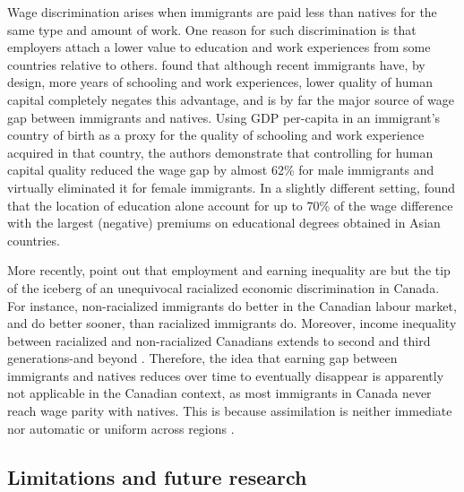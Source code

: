 \vspace{0.7em}\par
Wage discrimination arises when immigrants are paid less than natives for the same type and amount of work.
One reason for such discrimination is that employers attach a lower value to education and work experiences from some countries relative to others.
\citet{Coulombe:2014ir} found that although recent immigrants have, by design, more years of schooling and work experiences, lower quality of human capital completely negates this advantage, and is by far the major source of wage gap between immigrants and natives.
Using GDP per-capita in an immigrant's country of birth as a proxy for the quality of schooling and work experience acquired in that country, the authors demonstrate that controlling for human capital quality reduced the wage gap by almost 62\% for male immigrants and virtually eliminated it for female immigrants.
In a slightly different setting, \citet{Fortin:2016hl} found that the location of education alone account for up to 70\% of the wage difference with the largest (negative) premiums on educational degrees obtained in Asian countries.

\vspace{0.7em}\par
More recently,  \citet{Block:2019va} point out that employment and earning inequality are but the tip of the iceberg of an unequivocal racialized economic discrimination in Canada.
For instance, non-racialized immigrants do better in the Canadian labour market, and do better sooner, than racialized immigrants do.
Moreover, income inequality between racialized and non-racialized Canadians extends to second and third generations-and beyond \citep{Block:2019va}.
Therefore, the idea that earning gap between immigrants and natives reduces over time to eventually disappear is apparently not applicable in the Canadian context, as most immigrants in Canada never reach wage parity with natives.
This is because assimilation is neither immediate nor automatic \citep{Hum:2000gz} or uniform across regions \citep{Nadeau:2010jd}.


\subsection{Limitations and future research}

